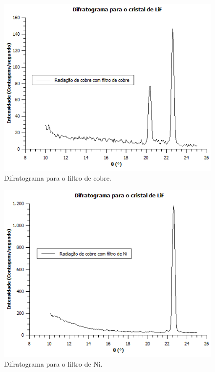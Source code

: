 \documentclass[article,12pt,openright,oneside,a4paper,brazil]{abntex2}
\begin{document}
\begin{figure}[H]
    \centering
    \includegraphics[scale=0.8]{Figuras/FiltroCu.png}
    \caption{Difratograma para o filtro de cobre.}
    \label{fig:filtrocu}
\end{figure}

\begin{figure}[H]
    \centering
    \includegraphics[scale=0.8]{Figuras/FiltroNi.png}
    \caption{Difratograma para o filtro de Ni.}
    \label{fig:filtroni}
\end{figure}
\end{document}
